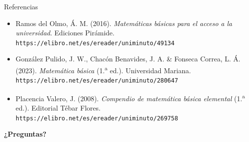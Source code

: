 \documentclass[aspectratio=169,10pt]{beamer}
\begin{document}
\begin{frame}{Referencias}
  \footnotesize
  \begin{itemize}
    \item[{[1]}] Ramos del Olmo, Á. M. (2016). \textit{Matemáticas básicas
      para el acceso a la universidad}. Ediciones Pirámide.
      \texttt{https://elibro.net/es/ereader/uniminuto/49134}
    \item[{[2]}] González Pulido, J. W., Chacón Benavides, J. A. \&
      Fonseca Correa, L. Á. (2023). \textit{Matemática básica} (1.\textsuperscript{a} ed.).
      Universidad Mariana.
      \texttt{https://elibro.net/es/ereader/uniminuto/280647}
    \item[{[3]}] Placencia Valero, J. (2008). \textit{Compendio de matemática
      básica elemental} (1.\textsuperscript{a} ed.). Editorial Tébar Flores.
      \texttt{https://elibro.net/es/ereader/uniminuto/269758}
  \end{itemize}

  \vspace{0.35cm}
  \begin{center}
    {\Large\color{uniAzul}\textbf{¿Preguntas?}}
  \end{center}
\end{frame}
\end{document}
